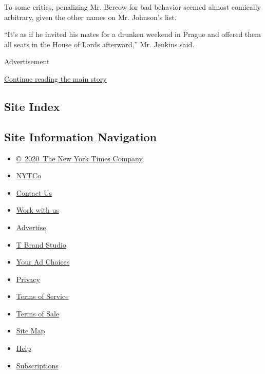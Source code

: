 To some critics, penalizing Mr. Bercow for bad behavior seemed almost
comically arbitrary, given the other names on Mr. Johnson's list.

``It's as if he invited his mates for a drunken weekend in Prague and
offered them all seats in the House of Lords afterward,'' Mr. Jenkins
said.

Advertisement

\protect\hyperlink{after-bottom}{Continue reading the main story}

\hypertarget{site-index}{%
\subsection{Site Index}\label{site-index}}

\hypertarget{site-information-navigation}{%
\subsection{Site Information
Navigation}\label{site-information-navigation}}

\begin{itemize}
\tightlist
\item
  \href{https://help.nytimes.com/hc/en-us/articles/115014792127-Copyright-notice}{©~2020~The
  New York Times Company}
\end{itemize}

\begin{itemize}
\tightlist
\item
  \href{https://www.nytco.com/}{NYTCo}
\item
  \href{https://help.nytimes.com/hc/en-us/articles/115015385887-Contact-Us}{Contact
  Us}
\item
  \href{https://www.nytco.com/careers/}{Work with us}
\item
  \href{https://nytmediakit.com/}{Advertise}
\item
  \href{http://www.tbrandstudio.com/}{T Brand Studio}
\item
  \href{https://www.nytimes.com/privacy/cookie-policy\#how-do-i-manage-trackers}{Your
  Ad Choices}
\item
  \href{https://www.nytimes.com/privacy}{Privacy}
\item
  \href{https://help.nytimes.com/hc/en-us/articles/115014893428-Terms-of-service}{Terms
  of Service}
\item
  \href{https://help.nytimes.com/hc/en-us/articles/115014893968-Terms-of-sale}{Terms
  of Sale}
\item
  \href{https://spiderbites.nytimes.com}{Site Map}
\item
  \href{https://help.nytimes.com/hc/en-us}{Help}
\item
  \href{https://www.nytimes.com/subscription?campaignId=37WXW}{Subscriptions}
\end{itemize}
